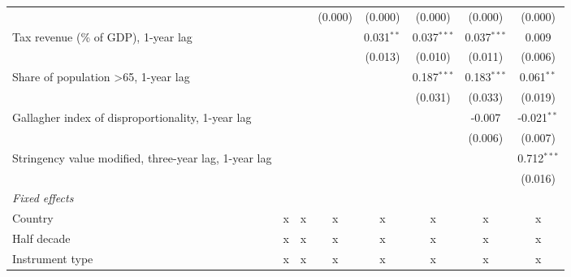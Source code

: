 \begin{tabular}{lccccccc}
                                                                           &                &                & (0.000)        & (0.000)        & (0.000)       & (0.000)       & (0.000)\\   
   Tax revenue (\% of GDP), 1-year lag                                     &                &                &                & 0.031$^{**}$   & 0.037$^{***}$ & 0.037$^{***}$ & 0.009\\   
                                                                           &                &                &                & (0.013)        & (0.010)       & (0.011)       & (0.006)\\   
   Share of population >65, 1-year lag                                     &                &                &                &                & 0.187$^{***}$ & 0.183$^{***}$ & 0.061$^{**}$\\   
                                                                           &                &                &                &                & (0.031)       & (0.033)       & (0.019)\\   
   Gallagher index of disproportionality, 1-year lag                       &                &                &                &                &               & -0.007        & -0.021$^{**}$\\   
                                                                           &                &                &                &                &               & (0.006)       & (0.007)\\   
   Stringency value modified, three-year lag, 1-year lag                   &                &                &                &                &               &               & 0.712$^{***}$\\   
                                                                           &                &                &                &                &               &               & (0.016)\\   
   \emph{Fixed effects}\\
   Country                                                                 & x              & x              & x              & x              & x             & x             & x\\  
   Half decade                                                             & x              & x              & x              & x              & x             & x             & x\\  
   Instrument type                                                         & x              & x              & x              & x              & x             & x             & x\\  

\end{tabular}

